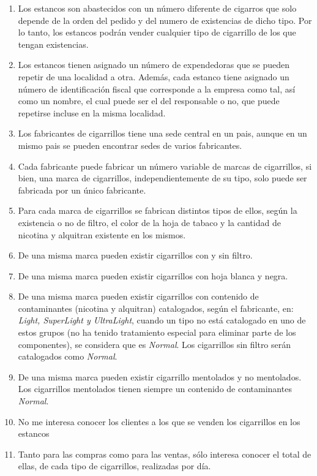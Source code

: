 \documentclass{article}
\begin{document}
\begin{enumerate}
  
  \item Los estancos son abastecidos con un número diferente de cigarros que solo depende de la orden del pedido y del numero de existencias de dicho tipo. Por lo tanto, los 
  estancos podrán vender cualquier tipo de cigarrillo de los que tengan existencias.
  
  \item Los estancos tienen asignado un número de expendedoras que se pueden repetir de una localidad a otra. Además, cada estanco tiene asignado un número de identificación 
  fiscal que corresponde a la empresa como tal, así como un nombre, el cual puede ser el del responsable o no, que puede repetirse incluse en la misma localidad.
  
  \item Los fabricantes de cigarrillos tiene una sede central en un pais, aunque en un mismo pais se pueden encontrar sedes de varios fabricantes.
  
  \item Cada fabricante puede fabricar un número variable de marcas de cigarrillos, si bien, una marca de cigarrillos, independientemente de su tipo, solo puede ser fabricada
  por un único fabricante.

  \item Para cada marca de cigarrillos se fabrican distintos tipos de ellos, según la existencia o no de filtro, el color de la hoja de tabaco y la cantidad de nicotina y 
  alquitran existente en los mismos.

  \item De una misma marca pueden existir cigarrillos con y sin filtro.
  
  \item De una misma marca pueden existir cigarrillos con hoja blanca y negra. 
  
  \item De una misma marca pueden existir cigarrillos con contenido de contaminantes (nicotina y alquitran) catalogados, según el fabricante, en: \textit{Light, SuperLight y UltraLight},
  cuando un tipo no está catalogado en uno de estos grupos (no ha tenido tratamiento especial para eliminar parte de los componentes), se considera que es \textit{Normal}. Los cigarrillos
  sin filtro serán catalogados como \textit{Normal}.

  \item De una misma marca pueden existir cigarrillo mentolados y no mentolados. Los cigarrillos mentolados tienen siempre un contenido de contaminantes \textit{Normal}.
  
  \item No me interesa conocer los clientes a los que se venden los cigarrillos en los estancos
  
  \item Tanto para las compras como para las ventas, sólo interesa conocer el total de ellas, de cada tipo de cigarrillos, realizadas por día.  

\end{enumerate}
\end{document}

